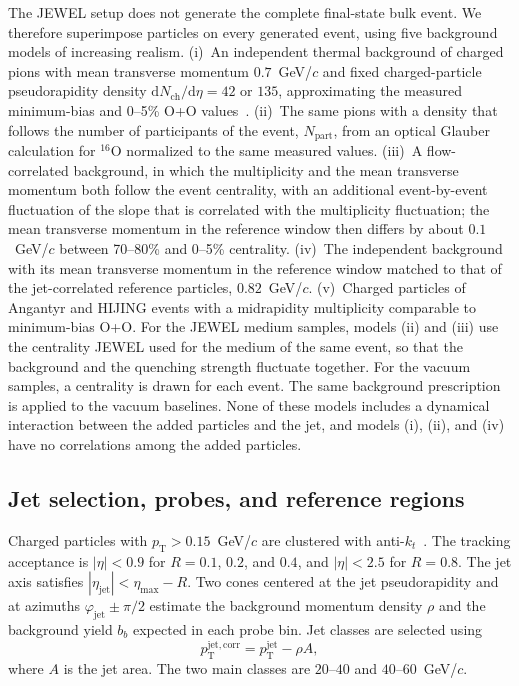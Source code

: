 \documentclass[aps,prc,twocolumn,superscriptaddress,nofootinbib,longbibliography,floatfix,10pt]{revtex4-2}
\newcommand{\pT}{p_{\mathrm T}}
\newcommand{\dd}{\mathrm d}
\begin{document}
The JEWEL setup does not generate the complete final-state bulk event. We therefore superimpose particles on every generated event, using five background models of increasing realism. (i)~An independent thermal background of charged pions with mean transverse momentum $0.7$~GeV/$c$ and fixed charged-particle pseudorapidity density $\dd N_{\mathrm{ch}}/\dd\eta=42$ or $135$, approximating the measured minimum-bias and 0--5\% O+O values~\cite{CMSMultiplicity}. (ii)~The same pions with a density that follows the number of participants of the event, $N_{\mathrm{part}}$, from an optical Glauber calculation for $^{16}$O normalized to the same measured values. (iii)~A flow-correlated background, in which the multiplicity and the mean transverse momentum both follow the event centrality, with an additional event-by-event fluctuation of the slope that is correlated with the multiplicity fluctuation; the mean transverse momentum in the reference window then differs by about $0.1$~GeV/$c$ between 70--80\% and 0--5\% centrality. (iv)~The independent background with its mean transverse momentum in the reference window matched to that of the jet-correlated reference particles, $0.82$~GeV/$c$. (v)~Charged particles of Angantyr and HIJING events with a midrapidity multiplicity comparable to minimum-bias O+O. For the JEWEL medium samples, models (ii) and (iii) use the centrality JEWEL used for the medium of the same event, so that the background and the quenching strength fluctuate together. For the vacuum samples, a centrality is drawn for each event. The same background prescription is applied to the vacuum baselines. None of these models includes a dynamical interaction between the added particles and the jet, and models (i), (ii), and (iv) have no correlations among the added particles.

\subsection{Jet selection, probes, and reference regions}
Charged particles with $\pT>0.15$~GeV/$c$ are clustered with anti-$k_t$~\cite{AntiKt,FastJet}. The tracking acceptance is $|\eta|<0.9$ for $R=0.1$, $0.2$, and $0.4$, and $|\eta|<2.5$ for $R=0.8$. The jet axis satisfies $|\eta_{\mathrm{jet}}|<\eta_{\max}-R$. Two cones centered at the jet pseudorapidity and at azimuths $\varphi_{\mathrm{jet}}\pm\pi/2$ estimate the background momentum density $\rho$ and the background yield $b_b$ expected in each probe bin. Jet classes are selected using
\begin{equation}
 p_{\mathrm T}^{\mathrm{jet,corr}}=p_{\mathrm T}^{\mathrm{jet}}-\rho A,
 \label{eq:jetcorr}
\end{equation}
where $A$ is the jet area. The two main classes are $20$--$40$ and $40$--$60$~GeV/$c$.
\end{document}
